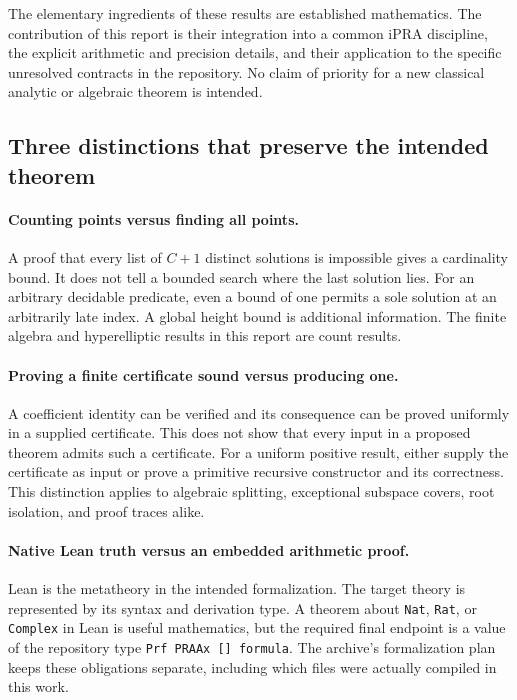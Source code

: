 The elementary ingredients of these results are established mathematics.
The contribution of this report is their integration into a common iPRA
discipline, the explicit arithmetic and precision details, and their
application to the specific unresolved contracts in the repository.
No claim of priority for a new classical analytic or algebraic theorem
is intended.

\subsection{Three distinctions that preserve the intended theorem}

\paragraph{Counting points versus finding all points.}
A proof that every list of $C+1$ distinct solutions is impossible gives
a cardinality bound. It does not tell a bounded search where the last
solution lies. For an arbitrary decidable predicate, even a bound of
one permits a sole solution at an arbitrarily late index. A global
height bound is additional information. The finite algebra and
hyperelliptic results in this report are count results.

\paragraph{Proving a finite certificate sound versus producing one.}
A coefficient identity can be verified and its consequence can be
proved uniformly in a supplied certificate. This does not show that
every input in a proposed theorem admits such a certificate. For a
uniform positive result, either supply the certificate as input or
prove a primitive recursive constructor and its correctness. This
distinction applies to algebraic splitting, exceptional subspace
covers, root isolation, and proof traces alike.

\paragraph{Native Lean truth versus an embedded arithmetic proof.}
Lean is the metatheory in the intended formalization. The target theory
is represented by its syntax and derivation type. A theorem about
\texttt{Nat}, \texttt{Rat}, or \texttt{Complex} in Lean is useful
mathematics, but the required final endpoint is a value of the repository
type \texttt{Prf PRAAx [] formula}. The archive's formalization plan
keeps these obligations separate, including which files were actually
compiled in this work.

